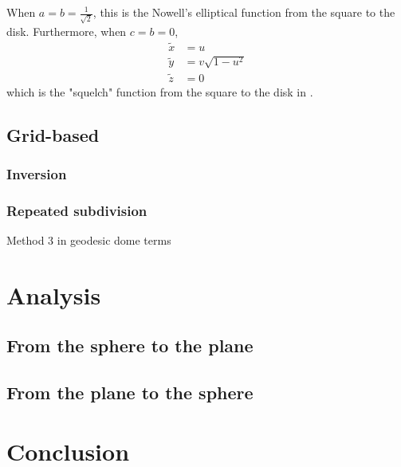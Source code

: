 \documentclass{amsart}[12pt]
\begin{document}
When $a=b=\frac{1}{\sqrt{2}}$, this is the Nowell's elliptical function from
the square to the disk.\cite{nowellsq}\cite{fong17} Furthermore, when $c=b=0$,
\begin{equation}\begin{split}
  \widetilde{x} &= u  \\
  \widetilde{y} &= v \sqrt{1 - u^2} \\
  \widetilde{z} &= 0
\end{split}\end{equation}
which is the "squelch" function from the square to the disk in \cite{fong17}.

\subsection{Grid-based}

\subsubsection{Inversion}

\subsubsection{Repeated subdivision}
Method 3 in geodesic dome terms

\section{Analysis}
\subsection{From the sphere to the plane}

\subsection{From the plane to the sphere}

\section{Conclusion}



\end{document}

